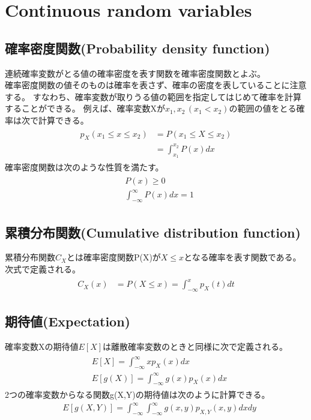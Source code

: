 \documentclass[a4j]{jarticle}
\begin{document}
\section{Continuous random variables}
\subsection{確率密度関数(Probability density function)}
連続確率変数がとる値の確率密度を表す関数を確率密度関数とよぶ。\\
確率密度関数の値そのものは確率を表さず、確率の密度を表していることに注意する。
すなわち、確率変数が取りうる値の範囲を指定してはじめて確率を計算することができる。
例えば、確率変数Xが$x_{1},x_{2}\,(x_{1} < x_{2})$の範囲の値をとる確率は次で計算できる。
\begin{align}
    \begin{aligned}
    p_{X}(x_{1} \leq x \leq x_{2})&=P(x_{1} \leq X \leq x_{2}) \\
    &=\int_{x_{1}}^{x_{2}}P(x)dx
    \end{aligned}
\end{align}
確率密度関数は次のような性質を満たす。
\begin{align}
    \begin{aligned}
    &P(x) \geq 0 \\
    &\int_{-\infty}^{\infty}P(x)dx = 1
    \end{aligned}
\end{align}

\subsection{累積分布関数(Cumulative distribution function)}
累積分布関数$C_{X}$とは確率密度関数P(X)が$X \leq x$となる確率を表す関数である。次式で定義される。
\begin{align}
    \begin{aligned}
    C_{X}(x) &= P(X \leq x) =\int_{-\infty}^{x}p_{X}(t)dt
    \end{aligned}
\end{align}


\subsection{期待値(Expectation)}
確率変数Xの期待値$E[X]$は離散確率変数のときと同様に次で定義される。
\begin{align}
    \begin{aligned}
    &E[X]=\int_{-\infty}^{\infty}xp_{X}(x)dx \\
    &E[g(X)]=\int_{-\infty}^{\infty}g(x)p_{X}(x)dx
    \end{aligned}
\end{align}
2つの確率変数からなる関数g(X,Y)の期待値は次のように計算できる。
\begin{align}
    &E[g(X,Y)]=\int_{-\infty}^{\infty}\int_{-\infty}^{\infty}g(x,y)p_{X,Y}(x,y)dxdy \\
\end{align}
\end{document}
